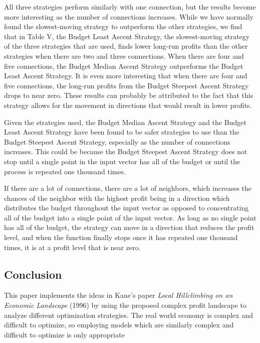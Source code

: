 All three strategies perform similarly with one connection, but the
results become more interesting as the number of connections increases.
While we have normally found the slowest-moving strategy to outperform
the other strategies, we find that in Table V, the Budget Least Ascent
Strategy, the slowest-moving strategy of the three strategies that are
used, finds lower long-run profits than the other strategies when there
are two and three connections. When there are four and five connections,
the Budget Median Ascent Strategy outperforms the Budget Least Ascent
Strategy. It is even more interesting that when there are four and
five connections, the long-run profits from the Budget Steepest Ascent
Strategy drops to near zero. These results can probably be attributed to
the fact that this strategy allows for the movement in directions that
would result in lower profits.

Given the strategies used, the Budget Median Ascent Strategy and the
Budget Least Ascent Strategy have been found to be safer strategies to
use than the Budget Steepest Ascent Strategy, especially as the number
of connections increases. This could be because the Budget Steepest
Ascent Strategy does not stop until a single point in the input vector
has all of the budget or until the process is repeated one thousand
times.

If there are a lot of connections, there are a lot of neighbors, which
increases the chances of the neighbor with the highest profit being in a
direction which distributes the budget throughout the input vector as
opposed to concentrating all of the budget into a single point of the
input vector. As long as no single point has all of the budget, the
strategy can move in a direction that reduces the profit level, and when
the function finally stops once it has repeated one thousand times, it
is at a profit level that is near zero.

\subsection{Conclusion}\label{conclusion}

This paper implements the ideas in Kane's paper
\emph{Local Hillclimbing on an Economic Landscape} (1996) by using the
proposed complex profit landscape to analyze different optimization
strategies. The real world economy is complex and difficult to optimize,
so employing models which are similarly complex and difficult to
optimize is only appropriate

